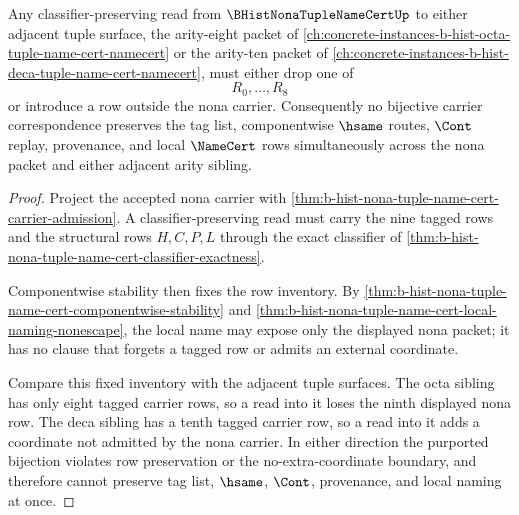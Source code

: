 \begin{theorem}
\label{thm:b-hist-nona-tuple-adjacent-arity-isolation}
Any classifier-preserving read from $\BHistNonaTupleNameCertUp$ to either adjacent tuple surface, the arity-eight packet of \autoref{ch:concrete-instances-b-hist-octa-tuple-name-cert-namecert} or the arity-ten packet of \autoref{ch:concrete-instances-b-hist-deca-tuple-name-cert-namecert}, must either drop one of
$$
R_0,\ldots,R_8
$$
or introduce a row outside the nona carrier. Consequently no bijective carrier correspondence preserves the tag list, componentwise $\hsame$ routes, $\Cont$ replay, provenance, and local $\NameCert$ rows simultaneously across the nona packet and either adjacent arity sibling.
\end{theorem}
\begin{proof}
Project the accepted nona carrier with \autoref{thm:b-hist-nona-tuple-name-cert-carrier-admission}. A classifier-preserving read must carry the nine tagged rows and the structural rows $H,C,P,L$ through the exact classifier of \autoref{thm:b-hist-nona-tuple-name-cert-classifier-exactness}.

Componentwise stability then fixes the row inventory. By \autoref{thm:b-hist-nona-tuple-name-cert-componentwise-stability} and \autoref{thm:b-hist-nona-tuple-name-cert-local-naming-nonescape}, the local name may expose only the displayed nona packet; it has no clause that forgets a tagged row or admits an external coordinate.

Compare this fixed inventory with the adjacent tuple surfaces. The octa sibling has only eight tagged carrier rows, so a read into it loses the ninth displayed nona row. The deca sibling has a tenth tagged carrier row, so a read into it adds a coordinate not admitted by the nona carrier. In either direction the purported bijection violates row preservation or the no-extra-coordinate boundary, and therefore cannot preserve tag list, $\hsame$, $\Cont$, provenance, and local naming at once.
\end{proof}

